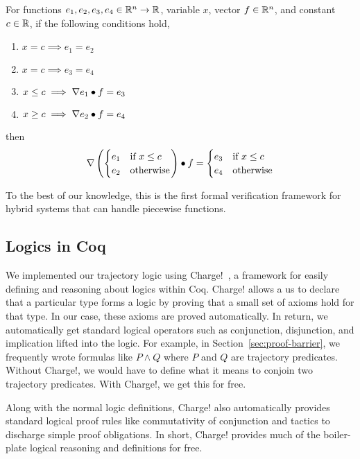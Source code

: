 \begin{lemma}
For functions $e_1, e_2, e_3, e_4 \in \mathbb{R}^n \rightarrow \mathbb{R}$, variable $x$,
vector $f \in \mathbb{R}^n$, and constant $c \in \mathbb{R}$, if the following conditions
hold,
\begin{enumerate}[label=\roman*), ref=\roman*]
\item $x = c \implies e_1 = e_2$
\item $x = c \implies e_3 = e_4$
\item $x \leq c \implies \nabla e_1 \bullet f = e_3$
\item $x \geq c \implies \nabla e_2 \bullet f = e_4$
\end{enumerate}
then
\[
\nabla \left(
\begin{cases}
e_1 & \text{if } x \leq c \\
e_2 & \text{otherwise}
\end{cases}
\right)
\bullet
f
=
\begin{cases}
e_3 & \text{if } x \leq c \\
e_4 & \text{otherwise}
\end{cases}
\]
\label{lem:pw-deriv}
\end{lemma}

To the best of our knowledge, this is the first formal verification
framework for hybrid systems that can handle piecewise functions.

\subsection{Logics in Coq}
We implemented our trajectory logic using Charge!~\cite{chargecoregit}, a
framework for easily defining and reasoning about logics within
Coq. Charge! allows a us to declare that a particular type forms a logic by
proving that a small set of axioms hold for that type. In our case, these
axioms are proved automatically. In return, we automatically get standard
logical operators such as conjunction, disjunction, and implication lifted
into the logic. For example, in Section~\ref{sec:proof-barrier}, we
frequently wrote formulas like $P \wedge Q$ where $P$ and $Q$ are
trajectory predicates. Without Charge!, we would have to define what it
means to conjoin two trajectory predicates. With Charge!, we get this for
free.

Along with the normal logic definitions, Charge! also automatically
provides standard logical proof rules like commutativity of conjunction and
tactics to discharge simple proof obligations. In short, Charge! provides
much of the boiler-plate logical reasoning and definitions for free.


